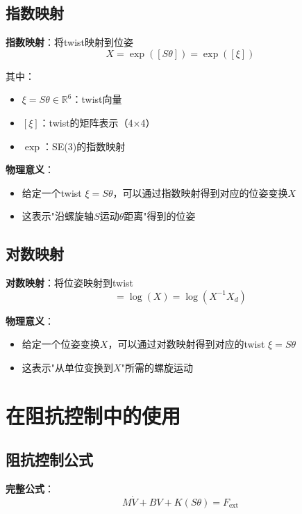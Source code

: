 \documentclass[12pt,a4paper]{article}
\begin{document}
\subsection{指数映射}

\textbf{指数映射}：将twist映射到位姿
\begin{equation}
X = \exp([S\theta]) = \exp([\xi])
\end{equation}

其中：
\begin{itemize}
\item $\xi = S\theta \in \mathbb{R}^6$：twist向量
\item $[\xi]$：twist的矩阵表示（4×4）
\item $\exp$：SE(3)的指数映射
\end{itemize}

\textbf{物理意义}：
\begin{itemize}
\item 给定一个twist $\xi = S\theta$，可以通过指数映射得到对应的位姿变换$X$
\item 这表示"沿螺旋轴$S$运动$\theta$距离"得到的位姿
\end{itemize}

\subsection{对数映射}

\textbf{对数映射}：将位姿映射到twist
\begin{equation}
[S\theta] = \log(X) = \log(X^{-1} X_d)
\end{equation}

\textbf{物理意义}：
\begin{itemize}
\item 给定一个位姿变换$X$，可以通过对数映射得到对应的twist $\xi = S\theta$
\item 这表示"从单位变换到$X$"所需的螺旋运动
\end{itemize}

\section{在阻抗控制中的使用}

\subsection{阻抗控制公式}

\textbf{完整公式}：
\begin{equation}
M\dot{V} + BV + K(S\theta) = F_{\text{ext}} \tag{11.64-twist}
\end{equation}
\end{document}
